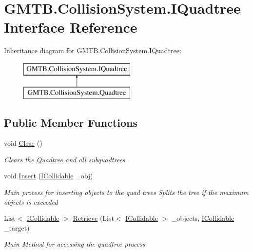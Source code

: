 \hypertarget{interface_g_m_t_b_1_1_collision_system_1_1_i_quadtree}{}\section{G\+M\+T\+B.\+Collision\+System.\+I\+Quadtree Interface Reference}
\label{interface_g_m_t_b_1_1_collision_system_1_1_i_quadtree}
Inheritance diagram for G\+M\+T\+B.\+Collision\+System.\+I\+Quadtree\+:\begin{figure}[H]
\begin{center}
\leavevmode
\includegraphics[height=2.000000cm]{interface_g_m_t_b_1_1_collision_system_1_1_i_quadtree}
\end{center}
\end{figure}
\subsection*{Public Member Functions}
\begin{DoxyCompactItemize}
\item 
void \mbox{\hyperlink{interface_g_m_t_b_1_1_collision_system_1_1_i_quadtree_a1c8e400a9e317fe0152b81e567823443}{Clear}} ()
\begin{DoxyCompactList}\small\item\em Clears the \mbox{\hyperlink{class_g_m_t_b_1_1_collision_system_1_1_quadtree}{Quadtree}} and all subquadtrees \end{DoxyCompactList}\item 
void \mbox{\hyperlink{interface_g_m_t_b_1_1_collision_system_1_1_i_quadtree_a22a84d4c7495fdb318cdd1d359c3591b}{Insert}} (\mbox{\hyperlink{interface_g_m_t_b_1_1_collision_system_1_1_i_collidable}{I\+Collidable}} \+\_\+obj)
\begin{DoxyCompactList}\small\item\em Main process for inserting objects to the quad trees Splits the tree if the maximum objects is exceeded \end{DoxyCompactList}\item 
List$<$ \mbox{\hyperlink{interface_g_m_t_b_1_1_collision_system_1_1_i_collidable}{I\+Collidable}} $>$ \mbox{\hyperlink{interface_g_m_t_b_1_1_collision_system_1_1_i_quadtree_a1d7564249805855fa89288bde1a673a9}{Retrieve}} (List$<$ \mbox{\hyperlink{interface_g_m_t_b_1_1_collision_system_1_1_i_collidable}{I\+Collidable}} $>$ \+\_\+objects, \mbox{\hyperlink{interface_g_m_t_b_1_1_collision_system_1_1_i_collidable}{I\+Collidable}} \+\_\+target)
\begin{DoxyCompactList}\small\item\em Main Method for accessing the quadtree process \end{DoxyCompactList}\end{DoxyCompactItemize}


